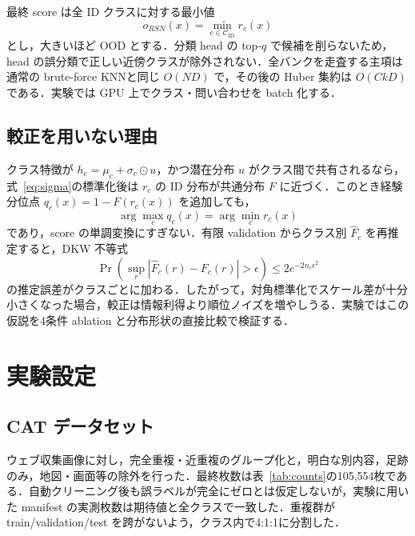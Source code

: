 \documentclass[uplatex,dvipdfmx,a4paper,10pt,twocolumn]{bxjsarticle}
\newcommand{\RSN}{RSN}
\newcommand{\knn}{KNN}
\begin{document}
最終 score は全 ID クラスに対する最小値
\begin{equation}
  o_{\RSN}(x)=\min_{c\in\mathcal{C}_{\mathrm{ID}}}r_c(x)
  \label{eq:score}
\end{equation}
とし，大きいほど OOD とする．分類 head の top-$q$ で候補を削らないため，head の誤分類で正しい近傍クラスが除外されない．全バンクを走査する主項は通常の brute-force \knn と同じ $O(ND)$ で，その後の Huber 集約は $O(CkD)$ である．実験では GPU 上でクラス・問い合わせを batch 化する．

\subsection{較正を用いない理由}

クラス特徴が $h_c=\mu_c+\sigma_c\odot u$，かつ潜在分布 $u$ がクラス間で共有されるなら，式~\eqref{eq:sigma}の標準化後は $r_c$ の ID 分布が共通分布 $F$ に近づく．このとき経験分位点 $q_c(x)=1-F(r_c(x))$ を追加しても，
\begin{equation}
  \arg\max_c q_c(x)=\arg\min_c r_c(x)
\end{equation}
であり，score の単調変換にすぎない．有限 validation からクラス別 $\hat F_c$ を再推定すると，DKW 不等式~\cite{dkw1956}
\begin{equation}
  \Pr\!\left(\sup_r|\hat F_c(r)-F_c(r)|>\epsilon\right)
  \le 2e^{-2n_c\epsilon^2}
\end{equation}
の推定誤差がクラスごとに加わる．したがって，対角標準化でスケール差が十分小さくなった場合，較正は情報利得より順位ノイズを増やしうる．実験ではこの仮説を4条件 ablation と分布形状の直接比較で検証する．

\section{実験設定}

\subsection{CAT データセット}

ウェブ収集画像に対し，完全重複・近重複のグループ化と，明白な別内容，足跡のみ，地図・画面等の除外を行った．最終枚数は表~\ref{tab:counts}の105,554枚である．自動クリーニング後も誤ラベルが完全にゼロとは仮定しないが，実験に用いた manifest の実測枚数は期待値と全クラスで一致した．重複群が train/validation/test を跨がないよう，クラス内で4:1:1に分割した．
\end{document}
